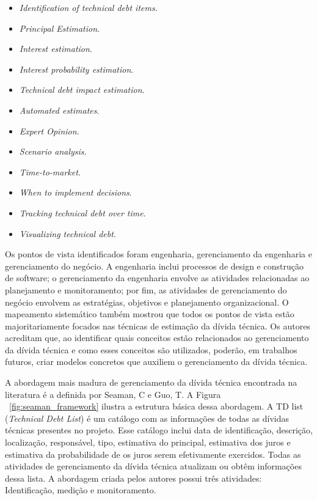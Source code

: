 \begin{itemize}
\item \textit{Identification of technical debt items}.
\item \textit{Principal Estimation}.
\item \textit{Interest estimation}.
\item \textit{Interest probability estimation}.
\item \textit{Technical debt impact estimation}.
\item \textit{Automated estimates}.
\item \textit{Expert Opinion}.
\item \textit{Scenario analysis}.
\item \textit{Time-to-market}.
\item \textit{When to implement decisions}.
\item \textit{Tracking technical debt over time}.
\item \textit{Visualizing technical debt}.
\end{itemize}

Os pontos de vista identificados foram engenharia, gerenciamento da engenharia e gerenciamento do negócio. A engenharia inclui processos de design e construção de software; o gerenciamento da engenharia envolve as atividades relacionadas ao planejamento e monitoramento; por fim, as atividades de gerenciamento do negócio envolvem as estratégias, objetivos  e planejamento organizacional. O mapeamento sistemático também mostrou que todos os pontos de vista estão majoritariamente focados nas técnicas de estimação da dívida técnica. Os autores acreditam que, ao identificar quais conceitos estão relacionados ao gerenciamento da dívida técnica e como esses conceitos são utilizados, poderão, em trabalhos futuros, criar modelos concretos que auxiliem o gerenciamento da dívida técnica.

A abordagem mais madura de gerenciamento da dívida técnica encontrada na literatura é a definida por Seaman, C e Guo, T\cite{seaman2011measuring}. A Figura ~\ref{fig:seaman_framework}  ilustra a estrutura básica dessa abordagem. A TD list (\textit{Technical Debt List}) é um catálogo com as informações de todas as dívidas técnicas presentes no projeto. Esse catálogo inclui data de identificação, descrição, localização, responsável, tipo, estimativa do principal, estimativa dos juros e estimativa da probabilidade de os juros serem efetivamente exercidos. Todas as atividades de gerenciamento da dívida técnica atualizam ou obtêm informações dessa lista. A abordagem criada pelos autores possui três atividades: Identificação, medição e monitoramento.  


